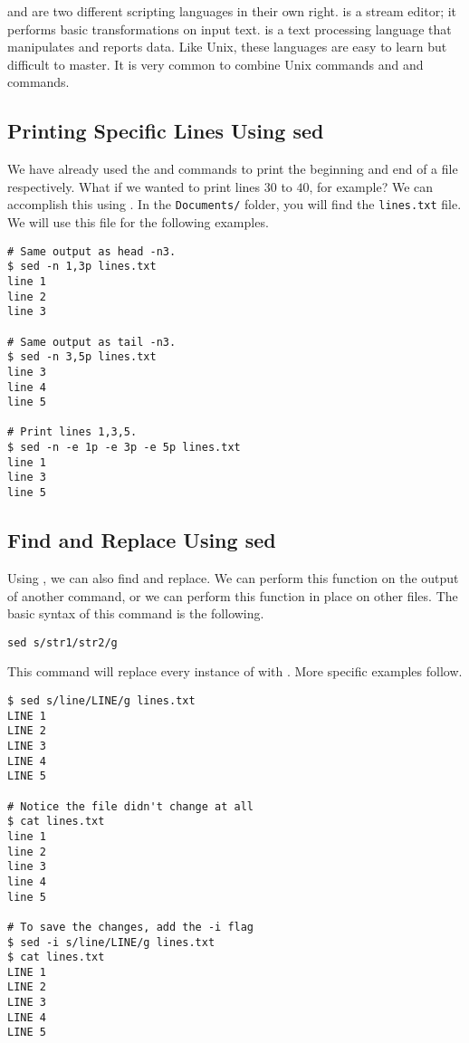  and  are two different scripting languages in their own right.
 is a stream editor; it performs basic transformations on input text.
 is a text processing language that manipulates and reports data.
Like Unix, these languages are easy to learn but difficult to master.
It is very common to combine Unix commands and  and  commands.

\subsection*{Printing Specific Lines Using sed} %

We have already used the  and  commands to print the beginning and end of a file respectively.
What if we wanted to print lines $30$ to $40$, for example?
We can accomplish this using .
In the \texttt{Documents/} folder, you will find the \texttt{lines.txt} file.
We will use this file for the following examples.

\begin{lstlisting}
# Same output as head -n3.
$ sed -n 1,3p lines.txt
line 1
line 2
line 3

# Same output as tail -n3.
$ sed -n 3,5p lines.txt
line 3
line 4
line 5

# Print lines 1,3,5.
$ sed -n -e 1p -e 3p -e 5p lines.txt
line 1
line 3
line 5
\end{lstlisting}

\subsection*{Find and Replace Using sed} %

Using , we can also find and replace.
We can perform this function on the output of another command, or we can perform this function in place on other files.
The basic syntax of this  command is the following.

\begin{lstlisting}
sed s/str1/str2/g
\end{lstlisting}

This command will replace every instance of  with . More specific examples follow.

\begin{lstlisting}
$ sed s/line/LINE/g lines.txt
LINE 1
LINE 2
LINE 3
LINE 4
LINE 5

# Notice the file didn't change at all
$ cat lines.txt
line 1
line 2
line 3
line 4
line 5

# To save the changes, add the -i flag
$ sed -i s/line/LINE/g lines.txt
$ cat lines.txt
LINE 1
LINE 2
LINE 3
LINE 4
LINE 5
\end{lstlisting}

